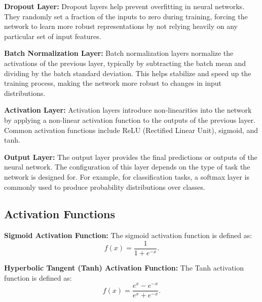 \begin{example}
    \textbf{Dropout Layer:} Dropout layers help prevent overfitting in neural networks. They randomly set a fraction of the inputs to zero during training, forcing the network to learn more robust representations by not relying heavily on any particular set of input features.
\end{example}
    
\begin{example}
    \textbf{Batch Normalization Layer:} Batch normalization layers normalize the activations of the previous layer, typically by subtracting the batch mean and dividing by the batch standard deviation. This helps stabilize and speed up the training process, making the network more robust to changes in input distributions.
\end{example}
    
\begin{example}
    \textbf{Activation Layer:} Activation layers introduce non-linearities into the network by applying a non-linear activation function to the outputs of the previous layer. Common activation functions include ReLU (Rectified Linear Unit), sigmoid, and tanh.
\end{example}
    
\begin{example}
    \textbf{Output Layer:} The output layer provides the final predictions or outputs of the neural network. The configuration of this layer depends on the type of task the network is designed for. For example, for classification tasks, a softmax layer is commonly used to produce probability distributions over classes.
\end{example}


\subsection{Activation Functions}

\begin{example}
    \textbf{Sigmoid Activation Function:}
    The sigmoid activation function is defined as:
    $$
    f(x) = \frac{1}{1 + e^{-x}}.
    $$
\end{example}
    
\begin{example}
    \textbf{Hyperbolic Tangent (Tanh) Activation Function:}
    The Tanh activation function is defined as:
    $$
    f(x) = \frac{e^x - e^{-x}}{e^x + e^{-x}}.
    $$
\end{example}
    
